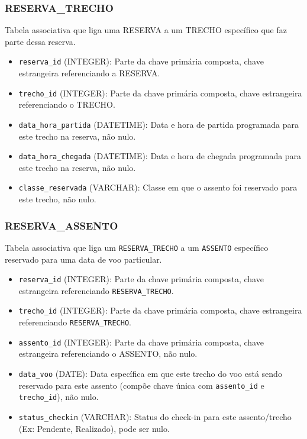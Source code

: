 \subsubsection*{RESERVA\_TRECHO}
Tabela associativa que liga uma RESERVA a um TRECHO específico que faz parte dessa reserva.
\begin{itemize}
    \item \texttt{reserva\_id} (INTEGER): Parte da chave primária composta, chave estrangeira referenciando a RESERVA.
    \item \texttt{trecho\_id} (INTEGER): Parte da chave primária composta, chave estrangeira referenciando o TRECHO.
    \item \texttt{data\_hora\_partida} (DATETIME): Data e hora de partida programada para este trecho na reserva, não nulo.
    \item \texttt{data\_hora\_chegada} (DATETIME): Data e hora de chegada programada para este trecho na reserva, não nulo.
    \item \texttt{classe\_reservada} (VARCHAR): Classe em que o assento foi reservado para este trecho, não nulo.
\end{itemize}

\subsubsection*{RESERVA\_ASSENTO}
Tabela associativa que liga um \texttt{RESERVA\_TRECHO} a um \texttt{ASSENTO} específico reservado para uma data de voo particular.
\begin{itemize}
    \item \texttt{reserva\_id} (INTEGER): Parte da chave primária composta, chave estrangeira referenciando \texttt{RESERVA\_TRECHO}.
    \item \texttt{trecho\_id} (INTEGER): Parte da chave primária composta, chave estrangeira referenciando \texttt{RESERVA\_TRECHO}.
    \item \texttt{assento\_id} (INTEGER): Parte da chave primária composta, chave estrangeira referenciando o ASSENTO, não nulo.
    \item \texttt{data\_voo} (DATE): Data específica em que este trecho do voo está sendo reservado para este assento (compõe chave única com \texttt{assento\_id} e \texttt{trecho\_id}), não nulo.
    \item \texttt{status\_checkin} (VARCHAR): Status do check-in para este assento/trecho (Ex: Pendente, Realizado), pode ser nulo.
\end{itemize}

